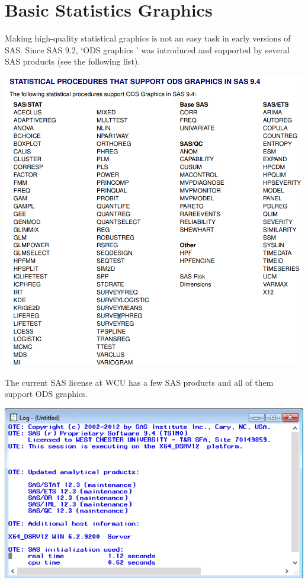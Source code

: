 \documentclass[
]{book}
\begin{document}
\hypertarget{basic-statistics-graphics}{%
\chapter{Basic Statistics Graphics}\label{basic-statistics-graphics}}

Making high-quality statistical graphics is not an easy task in early versions of SAS. Since SAS 9.2, `ODS graphics ' was introduced and supported by several SAS products (see the following list).

\begin{center}\includegraphics[width=0.8\linewidth]{img06/w06-OdsGraphicSupportedSASProducts} \end{center}

The current SAS license at WCU has a few SAS products and all of them support ODS graphics.

\begin{center}\includegraphics[width=0.8\linewidth]{img06/w06-WCUSASlicenseInfo} \end{center}
\end{document}
